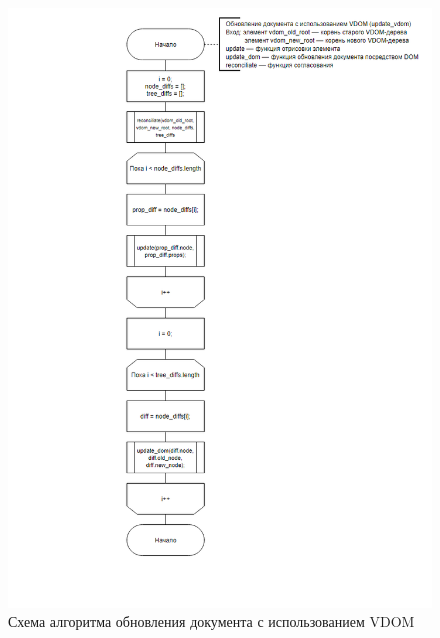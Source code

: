 \begin{figure}[h]
	\centering
	\includegraphics[width=170mm]{img/vdom-algorithm.png}
	\caption{Схема алгоритма обновления документа с использованием VDOM}
	\label{fig:vdom-algorithm}
\end{figure}

